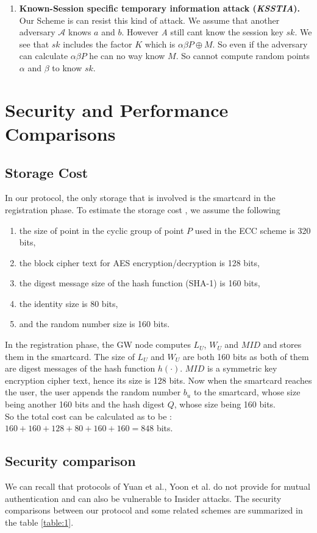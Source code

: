 \documentclass[a4paper,12pt]{report}
\begin{document}
\begin{enumerate}
\item \textbf{Known-Session specific temporary information attack (\textit{KSSTIA}).}\\ Our Scheme is can resist this kind of attack. We assume that another adversary $\mathcal{A}$ knows $a$ and $b$. However \textit{A} still cant know the session key $sk$. We see that $sk$ includes the factor $K$ which is $\alpha \beta P \oplus M$. So even if the adversary can calculate $\alpha \beta P$ he can no way know $M$. So cannot compute random points $\alpha$ and $\beta$ to know $sk$.
\end{enumerate}

\section{Security and Performance Comparisons}
\subsection{Storage Cost}
In our protocol, the only storage that is involved is the smartcard in the registration phase. To estimate the storage cost , we assume the following
\begin{enumerate}
\item the size of point in the cyclic group of point $P$ used in the ECC scheme is 320 bits,
\item the block cipher text for AES encryption/decryption is 128 bits,
\item the digest message size of the hash function (SHA-1) is 160 bits,
\item the identity size is 80 bits,
\item and the random number size is 160 bits.
\end{enumerate}

In the registration phase, the GW node computes $L_U$, $W_U$ and $MID$ and stores them in the smartcard. The size of $L_U$ and $W_U$ are both 160 bits as both of them are digest messages of the hash function $h(\cdot)$. $MID$ is a symmetric key encryption cipher text, hence its size is 128 bits. Now when the smartcard reaches the user, the user appends the random number $b_u$ to the smartcard, whose size being another 160 bits and the hash digest $Q$, whose size being 160 bits.\\
\linebreak
So the total cost can be calculated as to be : $ 160 + 160 +128 + 80 +160 + 160 = 848 $ bits.
\subsection{Security comparison}
We can recall that protocols of Yuan et al.\cite{yuan}, Yoon et al.\cite{yoon} do not provide for mutual authentication and can also be vulnerable to Insider attacks.
The security comparisons between our protocol and some related schemes are summarized in the table \ref{table:1}.
\end{document}
